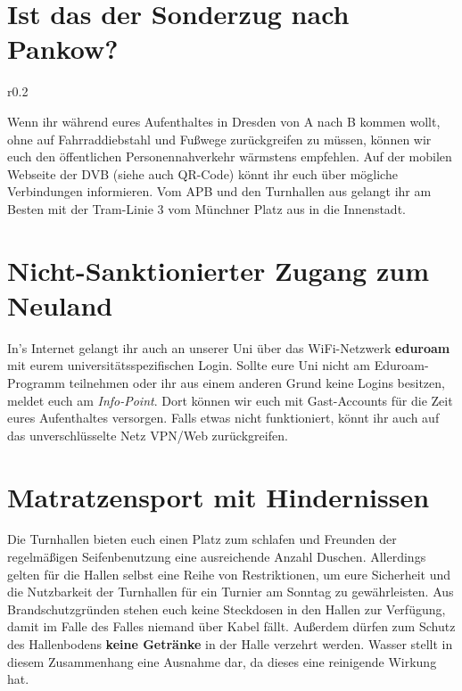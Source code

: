 \section*{Ist das der Sonderzug nach Pankow?}

\begin{wrapfigure}[6]{r}{0.2\textwidth}
  \vspace*{-11pt}
  \textcolor{KIFgrey}{}
\end{wrapfigure}

Wenn ihr während eures Aufenthaltes in Dresden von A nach B kommen wollt, ohne auf Fahrraddiebstahl und Fußwege zurückgreifen zu müssen, können wir euch den öffentlichen Personennahverkehr wärmstens empfehlen.
Auf der mobilen Webseite der DVB  (siehe auch QR-Code) könnt ihr euch über mögliche Verbindungen informieren.
Vom APB und den Turnhallen aus gelangt ihr am Besten mit der Tram-Linie 3 vom Münchner Platz aus in die Innenstadt.

\section*{Nicht-Sanktionierter Zugang zum Neuland}

In's Internet gelangt ihr auch an unserer Uni über das WiFi-Netzwerk \textbf{eduroam} mit eurem universitätsspezifischen Login.
Sollte eure Uni nicht am Eduroam-Programm teilnehmen oder ihr aus einem anderen Grund keine Logins besitzen, meldet euch am \emph{Info-Point}.
Dort können wir euch mit Gast-Accounts für die Zeit eures Aufenthaltes versorgen.
Falls etwas nicht funktioniert, könnt ihr auch auf das unverschlüsselte Netz VPN/Web zurückgreifen.

\section*{Matratzensport mit Hindernissen}

Die Turnhallen bieten euch einen Platz zum schlafen und Freunden der regelmäßigen Seifenbenutzung eine ausreichende Anzahl Duschen.
Allerdings gelten für die Hallen selbst eine Reihe von Restriktionen, um eure Sicherheit und die Nutzbarkeit der Turnhallen für ein Turnier am Sonntag zu gewährleisten.
Aus Brandschutzgründen stehen euch keine Steckdosen in den Hallen zur Verfügung, damit im Falle des Falles niemand über Kabel fällt.
Außerdem dürfen zum Schutz des Hallenbodens \textbf{keine Getränke} in der Halle verzehrt werden.
Wasser stellt in diesem Zusammenhang eine Ausnahme dar, da dieses eine reinigende Wirkung hat.

